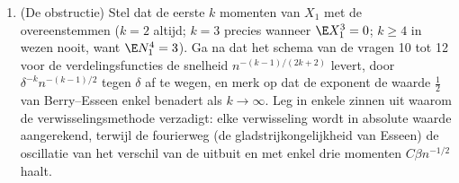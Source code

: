 \begin{problem}
\begin{enumerate}[resume]
{        is $\norm{\psi_\delta^{(4)}}_{L^1} = K_2\delta^{-3}$ en
        $M_4 = K'\delta^{-4}$; kies $\delta = n^{-1/4}$)}.
  \item (De obstructie) Stel dat de eerste $k$ momenten van $X_1$
        met de  overeenstemmen ($k = 2$ altijd; $k = 3$
        precies wanneer $\E X_1^3 = 0$; $k \geq 4$ in wezen
        nooit, want $\E N_1^4 = 3$). Ga na dat het schema van de
        vragen 10 tot 12 voor de verdelingsfuncties de snelheid
        $n^{-(k-1)/(2k+2)}$ levert, door $\delta^{-k}n^{-(k-1)/2}$
        tegen $\delta$ af te wegen, en merk op dat de exponent de
        waarde $\frac12$ van Berry--Esseen enkel benadert als $k
        \to \infty$. Leg in enkele zinnen uit waarom de
        verwisselingsmethode verzadigt: elke verwisseling wordt
        in absolute waarde aangerekend, terwijl de fourierweg (de
        gladstrijkongelijkheid van Esseen) de oscillatie van het
        verschil van de  uitbuit en met
        enkel drie momenten $C\beta n^{-1/2}$ haalt.
\end{enumerate}


\end{problem}
